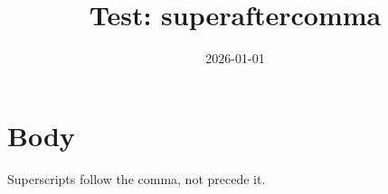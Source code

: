 \documentclass{article}
\title{Test: superaftercomma}
\date{2026-01-01}
\begin{document}
\maketitle
\section{Body}
Superscripts follow the comma, not precede it.
\end{document}
